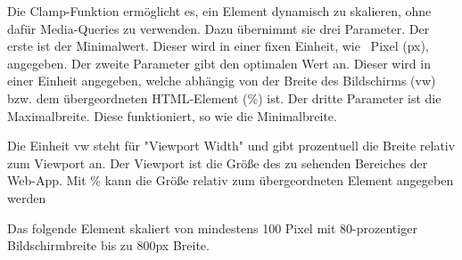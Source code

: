
Die Clamp-Funktion ermöglicht es, ein Element dynamisch zu skalieren, ohne dafür Media-Queries zu verwenden. Dazu übernimmt sie drei Parameter. Der erste ist der Minimalwert. Dieser wird in einer fixen Einheit, wie \zb\ Pixel (px), angegeben. Der zweite Parameter gibt den optimalen Wert an. Dieser wird in einer Einheit angegeben, welche abhängig von der Breite des Bildschirms (vw) bzw. dem übergeordneten HTML-Element (\%) ist. Der dritte Parameter ist die Maximalbreite. Diese funktioniert, so wie die Minimalbreite. 

Die Einheit vw steht für "Viewport Width" und gibt prozentuell die Breite relativ zum Viewport an. Der Viewport ist die Größe des zu sehenden Bereiches der Web-App. Mit \% kann die Größe relativ zum übergeordneten Element angegeben werden

Das folgende Element skaliert von mindestens 100 Pixel mit 80-prozentiger Bildschirmbreite bis zu 800px Breite.

